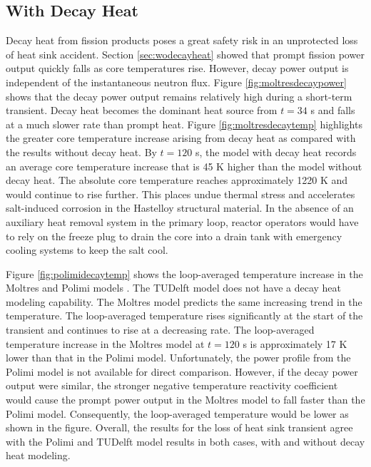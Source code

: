\clearpage

\subsection{With Decay Heat}

Decay heat from fission products poses a great safety risk in an unprotected
loss of
heat sink accident. Section \ref{sec:wodecayheat} showed that prompt fission
power output quickly falls as core temperatures rise. However, decay power
output is independent of the instantaneous neutron flux. Figure
\ref{fig:moltresdecaypower} shows that the decay power output remains
relatively high during a short-term transient. Decay heat becomes the dominant
heat source from $t=34$ s and falls at a much slower rate than prompt heat.
Figure \ref{fig:moltresdecaytemp} highlights the greater core temperature
increase arising from decay heat as compared with
the results without decay heat. By $t=120$ s, the model with decay heat
records an average core temperature increase that is 45 K higher than the
model without decay heat. The absolute core temperature reaches approximately
1220 K and would continue to rise further. This places undue thermal stress
and accelerates salt-induced corrosion in the Hastelloy structural material.
In the
absence of an auxiliary heat removal system in the primary loop, reactor
operators would have to rely on the freeze plug to drain the core into a drain
tank with emergency cooling systems to keep the salt cool.

Figure \ref{fig:polimidecaytemp} shows the loop-averaged temperature
increase in the Moltres and Polimi models \cite{fiorina_modelling_2014}. The
TUDelft model does not have a decay heat modeling capability. The Moltres
model predicts the same increasing trend in the temperature. The loop-averaged
temperature rises significantly at the start of the transient and continues to
rise at a decreasing rate. The loop-averaged temperature increase in the
Moltres model at $t=120$ s is approximately 17 K lower than that in the Polimi
model. Unfortunately, the power profile from the Polimi model is not available
for direct comparison.
However, if the decay power output were similar, the stronger negative
temperature reactivity coefficient would cause the prompt power output in the
Moltres model to fall faster than the Polimi model. Consequently, the
loop-averaged temperature would be lower as shown in the figure. Overall, the
results for the loss of heat sink transient agree with the Polimi and TUDelft
model results in both cases, with and without decay heat modeling.

